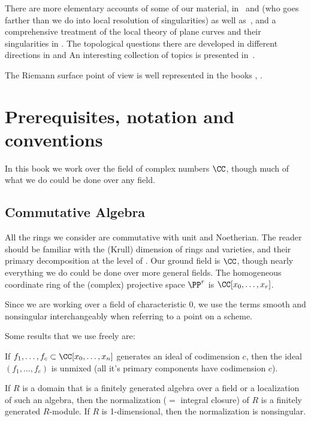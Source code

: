 There are more elementary accounts of some of our material, in~\cite{Fulton1989} and \cite{Walker1978} (who goes farther than we do into local resolution of singularities) as well as~\cite{Griffiths-curves}, and a comprehensive treatment of the local theory of plane curves and their singularities in \cite{Brieskorn1986}. The topological questions there are developed in different directions in \cite{MR0239612} %
 and \cite{MR817982}%
 An interesting collection of topics is presented in~\cite{Clemens-Scrapbook}.

 The Riemann surface point of view is well represented in the books \cite{Forster} \cite{Gunning}, \cite{Gunning-2} \cite{Kirwan}\cite{Miranda}. 


\section{Prerequisites, notation and conventions}

In this book we work over the field of complex numbers $\CC$, though much of what we do
could be done over any field. 

\subsection{Commutative Algebra} 
All the rings we consider are commutative with unit and Noetherian.
The reader should be familiar with the (Krull) dimension of rings and varieties, and their primary decomposition at the level of \cite{Atiyah-MacDonald}. Our ground field is $\CC$, though nearly everything we do could be done over more general fields. The homogeneous coordinate ring of the (complex) projective space $\PP^r$ is $\CC[x_0, \dots, x_r]$. 

Since we are working over  a field of characteristic 0, we use the terms smooth and nonsingular interchangeably when
referring to a point on a scheme.

Some results that we use freely are:
 \begin{theorem}\label{Lasker}
If $f_1,\dots, f_c \subset \CC[x_0,\dots, x_n]$ generates an ideal of codimension $c$, then 
the ideal $(f_1,\dots, f_c)$ is unmixed (all it's primary components have codimension $c$).
\end{theorem}

\begin{theorem}\label{finiteness of normalization}
 If $R$ is a domain that is a finitely generated algebra over a field or a localization of such an algebra, then the
normalization ($=$ integral closure) of $R$ is a finitely generated $R$-module.
If $R$ is 1-dimensional, then the normalization is nonsingular.
\end{theorem}

